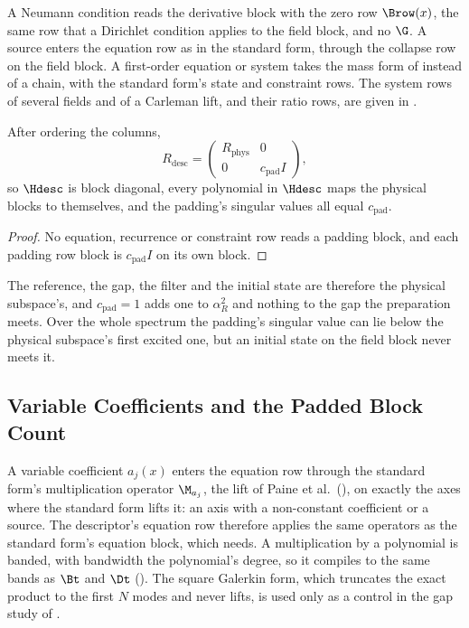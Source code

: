 A Neumann condition reads the derivative block with the zero row $\Brow(x)$, the same row that a Dirichlet condition applies to the field block, and no $\G$. A source enters the equation row as in the standard form, through the collapse row on the field block. A first-order equation or system takes the mass form of  instead of a chain, with the standard form's state and constraint rows. The system rows of several fields and of a Carleman lift, and their ratio rows, are given in .

\begin{proposition}
\label{prop:padding-decouples}
After ordering the columns,
\begin{equation*}
    R_{\mathrm{desc}}=\begin{pmatrix}R_{\mathrm{phys}}&0\\0&c_{\mathrm{pad}}I\end{pmatrix},
\end{equation*}
so $\Hdesc$ is block diagonal, every polynomial in $\Hdesc$ maps the physical blocks to themselves, and the padding's singular values all equal $c_{\mathrm{pad}}$.
\end{proposition}
\begin{proof}
No equation, recurrence or constraint row reads a padding block, and each padding row block is $c_{\mathrm{pad}}I$ on its own block.
\end{proof}

The reference, the gap, the filter and the initial state are therefore the physical subspace's, and $c_{\mathrm{pad}}=1$ adds one to $\alpha_R^2$ and nothing to the gap the preparation meets. Over the whole spectrum the padding's singular value can lie below the physical subspace's first excited one, but an initial state on the field block never meets it.

\subsection{Variable Coefficients and the Padded Block Count}
\label{sec:app-variable-coeff}

A variable coefficient $a_j(x)$ enters the equation row through the standard form's multiplication operator $\M_{a_j}$, the lift of Paine et al.\ (), on exactly the axes where the standard form lifts it: an axis with a non-constant coefficient or a source. The descriptor's equation row therefore applies the same operators as the standard form's equation block, which  needs. A multiplication by a polynomial is banded, with bandwidth the polynomial's degree, so it compiles to the same bands as $\Bt$ and $\Dt$ (). The square Galerkin form, which truncates the exact product to the first $N$ modes and never lifts, is used only as a control in the gap study of .


